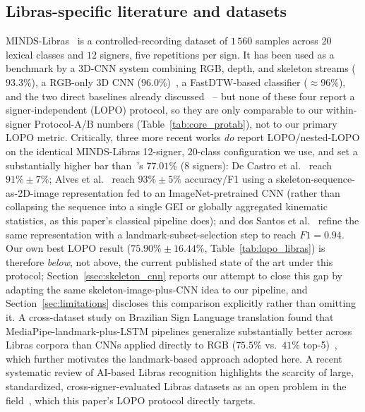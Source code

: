 \documentclass[journal]{IEEEtran}
\begin{document}
\subsection{Libras-specific literature and datasets}
MINDS-Libras~\cite{rezende2021minds} is a controlled-recording dataset of $1\,560$ samples across $20$ lexical classes and $12$ signers, five repetitions per sign. It has been used as a benchmark by a $3$D-CNN system combining RGB, depth, and skeleton streams ($93.3\%$), a RGB-only 3D CNN ($96.0\%$)~\cite{decastro2022}, a FastDTW-based classifier ($\approx96\%$), and the two direct baselines already discussed~\cite{passos2021,rego2025} -- but none of these four report a signer-independent (LOPO) protocol, so they are only comparable to our within-signer Protocol-A/B numbers (Table~\ref{tab:core_protab}), not to our primary LOPO metric. Critically, three more recent works \emph{do} report LOPO/nested-LOPO on the identical MINDS-Libras 12-signer, 20-class configuration we use, and set a substantially higher bar than~\cite{rego2025}'s $77.01\%$ (8 signers): De Castro et al.~\cite{decastro2023skeleton} reach $91\%\pm7\%$; Alves et al.~\cite{alves2024skeleton} reach $93\%\pm5\%$ accuracy/F1 using a skeleton-sequence-as-2D-image representation fed to an ImageNet-pretrained CNN (rather than collapsing the sequence into a single GEI or globally aggregated kinematic statistics, as this paper's classical pipeline does); and dos Santos et al.~\cite{dossantos2025landmarksubset} refine the same representation with a landmark-subset-selection step to reach $F1=0.94$. Our own best LOPO result ($75.90\%\pm16.44\%$, Table~\ref{tab:lopo_libras}) is therefore \emph{below}, not above, the current published state of the art under this protocol; Section~\ref{ssec:skeleton_cnn} reports our attempt to close this gap by adapting the same skeleton-image-plus-CNN idea to our pipeline, and Section~\ref{sec:limitations} discloses this comparison explicitly rather than omitting it. A cross-dataset study on Brazilian Sign Language translation found that MediaPipe-landmark-plus-LSTM pipelines generalize substantially better across Libras corpora than CNNs applied directly to RGB ($75.5\%$ vs.\ $41\%$ top-5)~\cite{sarmento2023}, which further motivates the landmark-based approach adopted here. A recent systematic review of AI-based Libras recognition highlights the scarcity of large, standardized, cross-signer-evaluated Libras datasets as an open problem in the field~\cite{costa2025review}, which this paper's LOPO protocol directly targets.
\end{document}

